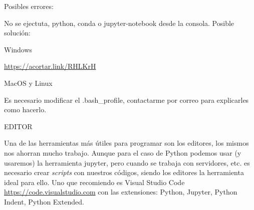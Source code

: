 \documentclass[12pt]{amsart} %
\begin{document}
Posibles errores:
\vspace{8pt}

No se ejectuta, python, conda o jupyter-notebook desde la consola. Posible solución:

\vspace{8pt}
Windows

\url{https://acortar.link/RHLKrH}

\vspace{8pt}
MacOS y Linux

Es necesario modificar el .bash\_profile, contactarme por correo para explicarles como hacerlo. 


\vspace{14pt}

\parbox[c]{235pt}{EDITOR}
\vspace{8pt}

Una de las herramientas más útiles para programar son los editores, los mismos nos ahorran mucho trabajo. Aunque para el caso de Python podemos usar (y usaremos) la herramienta jupyter, pero cuando se trabaja con servidores, etc. es necesario crear \textit{scripts} con nuestros códigos, siendo los editores la herramienta ideal para ello.  Uno que recomiendo es Visual Studio Code \url{https://code.visualstudio.com} con las extensiones: Python, Jupyter, Python Indent, Python Extended.

\end{document}
